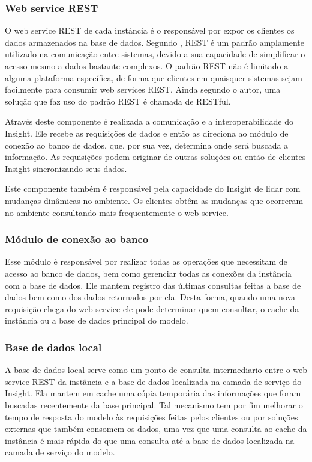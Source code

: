 \documentclass[english,brazilian]{UNISINOSmonografia}
\begin{document}
\subsubsection{Web service REST}
O web service REST de cada instância é o responsável por expor os clientes os dados armazenados na base de dados. Segundo , REST é um padrão amplamente utilizado na comunicação entre sistemas, devido a sua capacidade de simplificar o acesso mesmo a dados bastante complexos. O padrão REST não é limitado a alguma plataforma específica, de forma que clientes em quaisquer sistemas sejam facilmente para consumir web services REST. Ainda segundo o autor, uma solução que faz uso do padrão REST é chamada de RESTful.

Através deste componente é realizada a comunicação e a interoperabilidade do Insight. Ele recebe as requisições de dados e então as direciona ao módulo de conexão ao banco de dados, que, por sua vez, determina onde será buscada a informação. As requisições podem originar de outras soluções ou então de clientes Insight sincronizando seus dados.

Este componente também é responsável pela capacidade do Insight de lidar com mudanças dinâmicas no ambiente. Os clientes obtêm as mudanças que ocorreram no ambiente consultando mais frequentemente o web service.

\subsubsection{Módulo de conexão ao banco}
Esse módulo é responsável por realizar todas as operações que necessitam de acesso ao banco de dados, bem como gerenciar todas as conexões da instância com a base de dados. Ele mantem registro das últimas consultas feitas a base de dados bem como dos dados retornados por ela. Desta forma, quando uma nova requisição chega do web service ele pode determinar quem consultar, o cache da instância ou a base de dados principal do modelo. 

\subsubsection{Base de dados local}
A base de dados local serve como um ponto de consulta intermediario entre o web service REST da instância e a base de dados localizada na camada de serviço do Insight. Ela mantem em cache uma cópia temporária das informações que foram buscadas recentemente da base principal. Tal mecanismo tem por fim melhorar o tempo de resposta do modelo às requisições feitas pelos clientes ou por soluções externas que também consomem os dados, uma vez que uma consulta ao cache da instância é mais rápida do que uma consulta até a base de dados localizada na camada de serviço do modelo.
\end{document}
